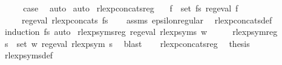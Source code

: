 \begin{isabellebody}
\ \ \isamarkupfalse%
\ \isamarkupfalse%
\ {\isacharquery}{\kern0pt}case\ \isamarkupfalse%
\ auto\isanewline
{}\isamarkupfalse%
\ auto%
\endisatagproof
{\isafoldproof}%
%
\isadelimproof
\isanewline
%
\endisadelimproof
\isanewline
{}\isamarkupfalse%
\ rlexp{\isacharunderscore}{\kern0pt}concats{\isacharunderscore}{\kern0pt}reg{\isacharcolon}{\kern0pt}\isanewline
\ \ \ {\isachardoublequoteopen}{\isasymforall}f\ {\isasymin}\ set\ fs{\isachardot}{\kern0pt}\ reg{\isacharunderscore}{\kern0pt}eval\ f{\isachardoublequoteclose}\isanewline
\ \ \ \ \ {\isachardoublequoteopen}reg{\isacharunderscore}{\kern0pt}eval\ {\isacharparenleft}{\kern0pt}rlexp{\isacharunderscore}{\kern0pt}concats\ fs{\isacharparenright}{\kern0pt}{\isachardoublequoteclose}\isanewline
%
\isadelimproof
\ \ %
\endisadelimproof
%
\isatagproof
{}\isamarkupfalse%
\ assms\ epsilon{\isacharunderscore}{\kern0pt}regular\ \isamarkupfalse%
\ rlexp{\isacharunderscore}{\kern0pt}concats{\isacharunderscore}{\kern0pt}def\ \isamarkupfalse%
\ {\isacharparenleft}{\kern0pt}induction\ fs{\isacharparenright}{\kern0pt}\ auto%
\endisatagproof
{\isafoldproof}%
%
\isadelimproof
\isanewline
%
\endisadelimproof
\isanewline
{}\isamarkupfalse%
\ rlexp{\isacharunderscore}{\kern0pt}syms{\isacharunderscore}{\kern0pt}reg{\isacharcolon}{\kern0pt}\ {\isachardoublequoteopen}reg{\isacharunderscore}{\kern0pt}eval\ {\isacharparenleft}{\kern0pt}rlexp{\isacharunderscore}{\kern0pt}syms\ w{\isacharparenright}{\kern0pt}{\isachardoublequoteclose}\isanewline
%
\isadelimproof
%
\endisadelimproof
%
\isatagproof
{}\isamarkupfalse%
\ {\isacharminus}{\kern0pt}\isanewline
\ \ \isamarkupfalse%
\ rlexp{\isacharunderscore}{\kern0pt}sym{\isacharunderscore}{\kern0pt}reg\ \isamarkupfalse%
\ {\isachardoublequoteopen}{\isasymforall}s\ {\isasymin}\ set\ w{\isachardot}{\kern0pt}\ reg{\isacharunderscore}{\kern0pt}eval\ {\isacharparenleft}{\kern0pt}rlexp{\isacharunderscore}{\kern0pt}sym\ s{\isacharparenright}{\kern0pt}{\isachardoublequoteclose}\ \isamarkupfalse%
\ blast\isanewline
\ \ \isamarkupfalse%
\ rlexp{\isacharunderscore}{\kern0pt}concats{\isacharunderscore}{\kern0pt}reg\ \isamarkupfalse%
\ {\isacharquery}{\kern0pt}thesis\ \isamarkupfalse%
\ rlexp{\isacharunderscore}{\kern0pt}syms{\isacharunderscore}{\kern0pt}def\isanewline

\end{isabellebody}
